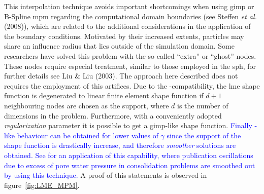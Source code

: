 \documentclass[preprint,12pt,a4paper]{elsarticle}
\newcommand{\MMP}[1]{
  \textcolor{blue}{{#1}}
}
\begin{document}
This interpolation technique avoids important shortcomings when using
\acrshort{gimp} or B-Spline \acrshort{mpm} regarding the computational domain boundaries
(see Steffen {\it et al.} (2008)\cite{Steffen2008b}), which are related to the
additional considerations in the application of the boundary
conditions. Motivated by their increased extents, particles may share an influence radius that lies outside of the simulation domain. Some researchers have solved this problem with the so called ``extra'' or ``ghost'' nodes. These nodes require especial treatment, similar
to those employed in the \acrfull{sph}, for
further details see Liu \& Liu (2003)\cite{Liu2003}. The approach here
described does not requires the employment of this artifices.
Due to the -compatibility, the \acrshort{lme} shape
function is degenerated to linear finite element shape function if
$d+1$ neighbouring nodes are chosen as the support, where $d$ is the
number of dimensions in the problem. Furthermore, with a conveniently
adopted \textit{regularization} parameter it is possible to get a 
\acrshort{gimp}-like shape function.\MMP{Finally -like
behaviour can be obtained for lower values of $\gamma$ since the
support of the shape function is drastically increase, and therefore
\textit{smoother} solutions are obtained. See \cite{Navas2016} for an
application of this capability, where publication oscillations due to
excess of pore water pressure in consolidation problems are smoothed out by using this technique.}A proof of this statements is observed in figure~\ref{fig:LME_MPM}.
\end{document}
